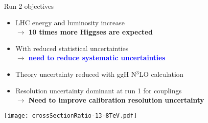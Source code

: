 \begin{frame}{Run 2 objectives}
  \begin{minipage}{0.49\linewidth}
  \begin{itemize}
  \item LHC energy and luminosity increase \\
    $\rightarrow$ {\bf 10 times more Higgses are expected}
  \item With reduced statistical uncertainties \\ $\rightarrow$ \textcolor{blue}{\bf need to reduce systematic uncertainties}
  \item Theory uncertainty reduced with ggH N$^3$LO calculation
  \item Resolution uncertainty dominant at run 1 for couplings \\
    $\rightarrow$ {\bf Need to improve calibration resolution uncertainty}
  \end{itemize}
  \end{minipage}
  \hfill
  \begin{minipage}{0.49\linewidth}
    \centering
    \texttt{[image: crossSectionRatio-13-8TeV.pdf]}\\
  \end{minipage}
\end{frame}
